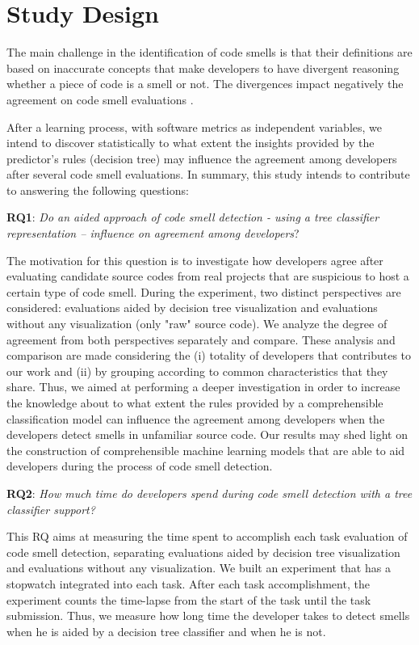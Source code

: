 \chapter{Study Design}
\label{sec:studydesign}

The main challenge in the identification of code smells is that their definitions are based on inaccurate concepts that make developers to have divergent reasoning whether a piece of code is a smell or not. The divergences impact negatively the agreement on code smell evaluations \cite{hozano2018you}.

After a learning process, with software metrics as independent variables,  we intend to discover statistically to what extent the insights provided by the predictor's rules (decision tree) may influence the agreement among developers after several code smell evaluations. In summary, this study intends to contribute to answering the following questions:

\textbf{RQ1}: \textit{Do an aided approach of code smell detection - using a tree classifier representation – influence on agreement among developers}?

The motivation for this question is to investigate how developers agree after evaluating candidate source codes from real projects that are suspicious to host a certain type of code smell. During the experiment, two distinct perspectives are considered: evaluations aided by decision tree visualization and evaluations without any visualization (only "raw" source code). We analyze the degree of agreement from both perspectives separately and compare.
These analysis and comparison are made considering the (i) totality of developers that contributes to our work and (ii) by grouping according to common characteristics that they share. Thus, we aimed at performing a deeper investigation in order to increase the knowledge about to what extent the rules provided by a comprehensible classification model can influence the agreement among developers when the developers detect smells in unfamiliar source code. Our results may shed light on the construction of comprehensible machine learning models that are able to aid developers during the process of code smell detection.

\textbf{RQ2}: \textit{How much time do developers spend during code smell detection with a tree classifier support?}

This RQ aims at measuring the time spent to accomplish each task evaluation of code smell detection, separating evaluations aided by decision tree visualization and evaluations without any visualization. We built an experiment that has a stopwatch integrated into each task. After each task accomplishment, the experiment counts the time-lapse from the start of the task until the task submission. Thus, we measure how long time the developer takes to detect smells when he is aided by a decision tree classifier and when he is not.

